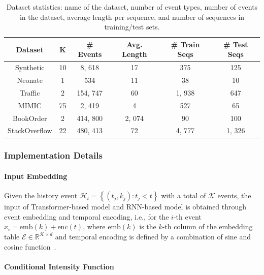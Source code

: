 \begin{table}[htbp]
    \centering
    \caption{Dataset statistics: name of the dataset, number of event types, number of events in the dataset, average length per sequence, and number of sequences in training/test sets.}
    \begin{tabular}{c|c|c|c|c|c}
    \toprule
         Dataset & K & \# Events & Avg. Length & \# Train Seqs & \# Test Seqs  \\
    \midrule
         Synthetic & 10 & 8, 618 & 17 & 375 & 125\\
         Neonate & 1 & 534 & 11 & 38 & 10 \\
         Traffic & 2 & 154, 747 & 60 & 1, 938 & 647 \\
         MIMIC & 75 & 2, 419 & 4 & 527 & 65 \\
         BookOrder & 2 & 414, 800 & 2, 074 & 90 & 100 \\
         StackOverflow & 22 & 480, 413 & 72 & 4, 777 & 1, 326 \\
    \bottomrule
    \end{tabular}
    \label{tab:data}
\end{table}

\subsubsection{Implementation Details} 

\paragraph{Input Embedding}

Given the history event $\mathcal{H}_t=\left\{\left(t_j, k_j\right): t_j<t\right\}$ with a total of $\mathcal{K}$ events, the input of Transformer-based model and RNN-based model is obtained through event embedding and temporal encoding, i.e., for the $i$-th event $x_i = \text{emb}(k) + \text{enc}(t)$, where $\text{emb}(k)$ is the $k$-th column of the embedding table $\mathcal{E} \in \mathbb{R}^{\mathcal{K} \times d}$ and temporal encoding is defined by a combination of sine and cosine function~\cite{zuo2020transformer}.

\paragraph{Conditional Intensity Function}

